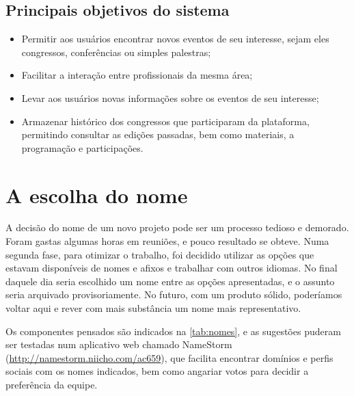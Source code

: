 \documentclass[12pt,a4paper,twoside,hyphens,english,brazil]{abntex2}
\begin{document}
\subsection{Principais objetivos do sistema}
\begin{itemize}
	\item Permitir aos usuários encontrar novos eventos de seu interesse, sejam eles congressos, conferências ou simples palestras;
	\item Facilitar a interação entre profissionais da mesma área;
	\item Levar aos usuários novas informações sobre os eventos de seu interesse;
	\item Armazenar histórico dos congressos que participaram da plataforma, permitindo consultar as edições passadas, bem como materiais, a programação e participações.
\end{itemize}



\section{A escolha do nome}

A decisão do nome de um novo projeto pode ser um processo tedioso e demorado. Foram gastas algumas horas em reuniões, e pouco resultado se obteve. Numa segunda fase, para otimizar o trabalho, foi decidido utilizar as opções que estavam disponíveis de nomes e afixos e trabalhar com outros idiomas. No final daquele dia seria escolhido um nome entre as opções apresentadas, e o assunto seria arquivado provisoriamente. No futuro, com um produto sólido, poderíamos voltar aqui e rever com mais substância um nome mais representativo.

Os componentes pensados são indicados na \autoref{tab:nomes}, e as sugestões puderam ser testadas num aplicativo web chamado NameStorm (\url{http://namestorm.niicho.com/ac659}), que facilita encontrar domínios e perfis sociais com os nomes indicados, bem como angariar votos para decidir a preferência da equipe.\\
\end{document}
